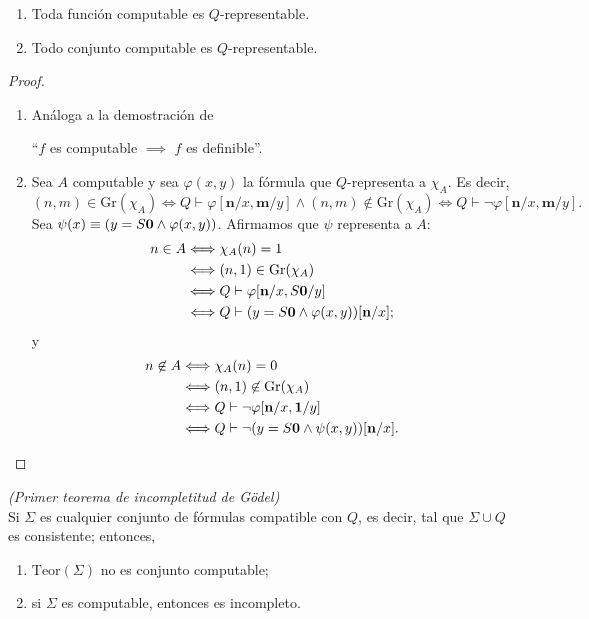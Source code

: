 \begin{thm}\hspace{0.5cm}
    \begin{enumerate}
        \item Toda función computable es $Q$-representable.
        \item Todo conjunto computable es $Q$-representable.
    \end{enumerate}
\end{thm}
\begin{proof}\hspace{1cm}
    \begin{enumerate}
        \item Análoga a la demostración de 
            \begin{center}
                ``$f$ es computable $\implies$ $f$ es definible''.
            \end{center}
        \item Sea $A$ computable y sea $\varphi(x,y)$ la fórmula que $Q$-representa a $\chi_A$. Es decir,
            \[(n,m)\in\text{Gr}(\chi_A)\Longleftrightarrow Q\vdash\varphi[\mathbf{n}/x,\mathbf{m}/y]\land (n,m)\not\in\text{Gr}(\chi_A)\Longleftrightarrow Q\vdash\neg\varphi[\mathbf{n}/x,\mathbf{m}/y].\]
            Sea $\psi(x)\equiv(y=S\mathbf{0}\land\varphi(x,y))$. Afirmamos que $\psi$ representa a $A$:
            \begin{align*}
                n\in A&\Longleftrightarrow\chi_A(n)=1\\
                &\Longleftrightarrow(n,1)\in\text{Gr}(\chi_A)\\
                &\Longleftrightarrow Q\vdash\varphi[\mathbf{n}/x,S\mathbf{0}/y]\\
                &\Longleftrightarrow Q\vdash(y=S\mathbf{0}\land\varphi(x,y))[\mathbf{n}/x];
            \end{align*}
            y
            \begin{align*}
                n\not\in A&\Longleftrightarrow\chi_A(n)=0\\
                &\Longleftrightarrow(n,1)\not\in\text{Gr}(\chi_A)\\
                &\Longleftrightarrow Q\vdash\neg\varphi[\mathbf{n}/x,\mathbf{1}/y]\\
                &\Longleftrightarrow Q\vdash\neg(y=S\mathbf{0}\land\psi(x,y))[\mathbf{n}/x].
            \end{align*}
    \end{enumerate}
\end{proof}
\begin{thm} \textit{(Primer teorema de incompletitud de Gödel)}\\
    Si $\Sigma$ es cualquier conjunto de fórmulas compatible con $Q$, es decir, tal que $\Sigma\cup Q$ es consistente; entonces,
    \begin{enumerate}
        \item $\text{Teor}(\Sigma)$ no es conjunto computable;
        \item si $\Sigma$ es computable, entonces es incompleto.
    \end{enumerate}
\end{thm}

